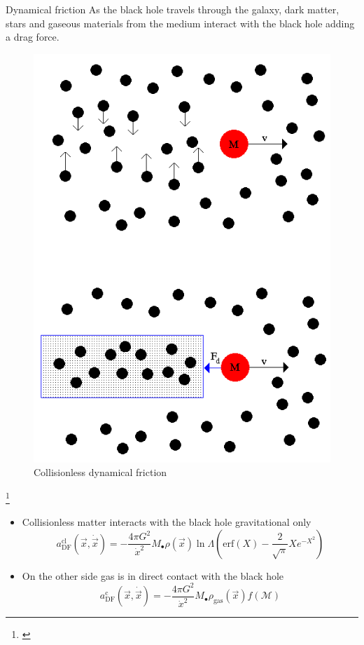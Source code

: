 \documentclass{beamer}
\newcommand{\erf}[1]{\text{erf}\left(#1\right)}
\newcommand\blfootnote[1]
{%
	\begingroup
	\renewcommand\thefootnote{}\footnote{#1}%
	\addtocounter{footnote}{-1}%
	\endgroup
}
\newcommand{\fcite}[1]{\blfootnote{\tiny\cite{#1}}}
\begin{document}
\begin{frame}{Dynamical friction}
	As the black hole travels through the galaxy, dark matter, stars and gaseous materials from the medium interact with the black hole adding a drag force.
	\begin{figure}[h]
		\centering
		\includegraphics[width = 0.25\linewidth]{images/dyn_friction}
		\caption{Collisionless dynamical friction}
	\end{figure}
	\fcite{df_image}
\end{frame}

\begin{frame}
	\begin{itemize}
	\item Collisionless matter interacts with the black hole gravitational only
	\begin{equation}\label{eq: df_cl}
	a_\text{DF}^\text{cl}(\vec{x}, \dot{\vec{x}}) = -\dfrac{4\pi G^2}{\dot{x}^2} M_\bullet\rho(\vec{x})\ln\Lambda\left(\erf{X} - \dfrac{2}{\sqrt{\pi}}Xe^{-X^2}\right)
	\end{equation}
	
	\item On the other side gas is in direct contact with the black hole
	\begin{equation}\label{eq: df_c}
	a^\text{c}_\text{DF}(\vec{x}, \dot{\vec{x}}) = -\dfrac{4\pi G^2}{\dot{x}^2}M_\bullet\rho_\text{gas}(\vec{x})f(\mathcal{M})
	\end{equation}
	\end{itemize}
\end{frame}
\end{document}
